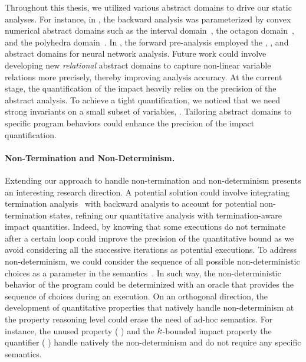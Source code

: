 Throughout this thesis, we utilized various abstract domains to drive our static analyses.
For instance, in , the backward analysis was parameterized by convex numerical abstract domains such as the interval domain~, the octagon domain~, and the polyhedra domain~\cite{Cousot1978}.
In , the forward pre-analysis employed the \symbolic{} \cite{Wang2018b}, \deeppoly{} \cite{Singh2019}, and \neurify{} \cite{Wang2018a} abstract domains for neural network analysis.
Future work could involve developing new \emph{relational} abstract domains to capture non-linear variable relations more precisely, thereby improving analysis accuracy.
At the current stage, the quantification of the impact heavily relies on the precision of the abstract analysis.
To achieve a tight quantification, we noticed that we need strong invariants on a small subset of variables, \cf{} .
Tailoring abstract domains to specific program behaviors could enhance the precision of the impact quantification.

\paragraph{Non-Termination and Non-Determinism.}
Extending our approach to handle non-termination and non-determinism presents an interesting research direction.
A potential solution could involve integrating termination analysis~ with backward analysis to account for potential non-termination states, refining our quantitative analysis with termination-aware impact quantities.
Indeed, by knowing that some executions do not terminate after a certain loop could improve the precision of the quantitative bound as we avoid considering all the successive iterations as potential executions.
To address non-determinism, we could consider the sequence of all possible non-deterministic choices as a parameter in the semantics~.
In such way, the non-deterministic behavior of the program could be determinized with an oracle that provides the sequence of choices during an execution.
On an orthogonal direction, the development of quantitative properties that natively handle non-determinism at the property reasoning level could erase the need of ad-hoc semantics.
For instance, the unused property (\cf{} ) and the $k$-bounded impact property \wrt{} the \qusedname
quantifier (\cf{} ) handle natively the non-determinism and do not require any specific semantics.


